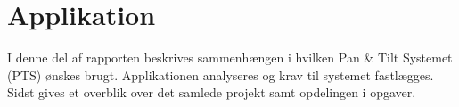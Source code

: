 \cleardoublepage
{}
\setcounter{page}{1}
\part{Applikation}
I denne del af rapporten beskrives sammenhængen i hvilken Pan \& Tilt Systemet (PTS) 
ønskes brugt. Applikationen analyseres og krav til systemet fastlægges. Sidst 
gives et overblik over det samlede projekt samt opdelingen i opgaver.



